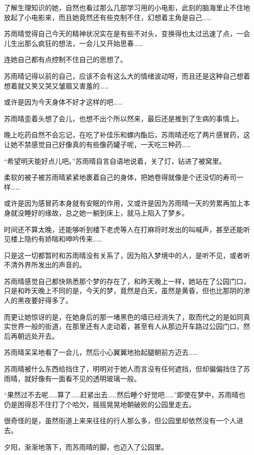了解生理知识的她，自然也看过那么几部学习用的小电影，此刻的脑海里止不住地放起了小电影来，而且她竟然还有些克制不住，幻想着主角是自己……

苏雨晴觉得自己今天的精神状况实在是有些不对头，变换得也太过迅速了点，一会儿生出那么疯狂的想法，一会儿又开始思春……

连她自己都有点控制不住自己的思想了。

苏雨晴记得以前的自己，应该不会有这么大的情绪波动呀，而且还是这种自己想着想着就又笑又哭又皱眉又害羞的……

或许是因为今天身体不好才这样的吧……

苏雨晴歪着头想了会儿，也想不出个所以然来，最后还是推到了生病的事情上。

晚上吃药自然不会忘记，在吃了补佳乐和螺内酯后，苏雨晴还吃了两片感冒药，这让她不禁感觉自己好像真的有些像药罐子呢，一天吃三种药……

“希望明天能好点儿吧。”苏雨晴自言自语地说着，关了灯，钻进了被窝里。

柔软的被子被苏雨晴紧紧地裹着自己的身体，把她卷得就像是个还没切的寿司一样……

或许是因为感冒药本身就有安眠的作用，又或许是因为苏雨晴一天的劳累再加上本身就没睡好的缘故，总之她一躺到床上，就马上陷入了梦乡。

时间还不算太晚，还能够听到楼下老虎等人在打麻将时发出的叫喊声，甚至还能听见楼上隐约有娇喘和呻吟传来……

只是这一切都暂时和苏雨晴没有关系了，因为陷入梦境中的人，是听不见，或者听不清外界所发出的声音的。

苏雨晴感觉自己都快熟悉那个梦的存在了，和昨天晚上一样，她站在了公园门口，只是和昨天晚上不同的是，今天的梦，竟然是白天，虽然是黄昏，但也比那阴的渗人的黑夜要好得多了。

而更让她惊讶的是，在她身后的那一堵黑色的墙已经消失了，取而代之的是如同真实世界一般的街道，在那里还有人走动着，甚至有人从那边开车路过公园门口，然后再朝远处开去。

苏雨晴呆呆地看了一会儿，然后小心翼翼地抬起腿朝前方迈去……

苏雨晴被什么东西给挡住了，明明对于她人而言没有任何遮挡，但却偏偏挡住了苏雨晴，就好像有一面看不见的透明玻璃一般。

“果然过不去呢……算了……赶紧出去……然后睡个好觉吧……”即使在梦中，苏雨晴也仍是困得忍不住打了个哈欠，摇摇晃晃地朝破败的公园里走去。

很奇怪的是，虽然街道上来来往往的行人那么多，但公园里却依然没有一个人进去。

夕阳，渐渐地落下，而苏雨晴的脚，也迈入了公园里。

